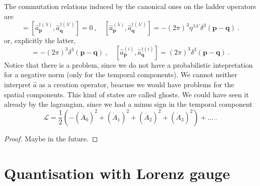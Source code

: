     The commutation relations induced by the canonical ones on the ladder operators are 
    \begin{equation*}
        [\hat a_{\mathbf p}^{(\lambda)}, \hat a_{\mathbf q}^{(\lambda')}] = [\hat a_{\mathbf p}^{\dagger (\lambda)}, \hat a_{\mathbf q}^{\dagger (\lambda')}] = 0 ~, \quad [\hat a_{\mathbf p}^{(\lambda)}, \hat a_{\mathbf q}^{\dagger(\lambda')}] = - (2\pi)^3 \eta^{\lambda \lambda'} \delta^3 (\mathbf p - \mathbf q) ~.
    \end{equation*}
    or, explicitly the latter, 
    \begin{equation*}
        [\hat a_{\mathbf p}^{(0)}, \hat a_{\mathbf q}^{\dagger (0)}] = - (2\pi)^3 \delta^3 (\mathbf p - \mathbf q) ~, \quad [\hat a_{\mathbf p}^{(i)}, \hat a_{\mathbf q}^{\dagger (i)}] = (2\pi)^3 \delta^3 (\mathbf p - \mathbf q) ~.
    \end{equation*}
    Notice that there is a problem, since we do not have a probabilistic intepretation for a negative norm (only for the temporal components). We cannot neither interpret $\hat a$ as a creation operator, beacuse we would have problems for the spatial components. This kind of states are called ghosts. We could have seen it already by the lagrangian, since we had a minus sign in the temporal component
    \begin{equation*}
        \mathcal L = \frac{1}{2} (- (\dot A_0)^2 + (\dot A_1)^2 + (\dot A_2)^2 +(\dot A_3)^2 ) + \ldots ~.
    \end{equation*}
    \begin{proof}
        Maybe in the future.
    \end{proof}

\section{Quantisation with Lorenz gauge}